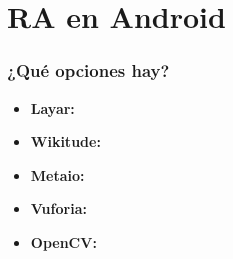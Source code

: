 \section{RA en Android}
\frame
{
\frametitle{¿Qué opciones hay?}
\begin{itemize}
\item \textbf{Layar:} 
\item \textbf{Wikitude:} 
\item \textbf{Metaio:} 
\item \textbf{Vuforia:} 
\item \textbf{OpenCV:} 
\end{itemize}
}
